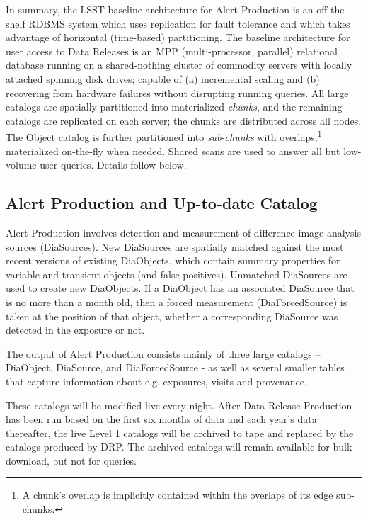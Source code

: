 \documentclass[DM,lsstdraft,toc]{lsstdoc}
\begin{document}
In summary, the LSST baseline architecture for Alert Production is an
off-the-shelf RDBMS system which uses replication for fault tolerance
and which takes advantage of horizontal (time-based) partitioning. The
baseline architecture for user access to Data Releases is an MPP
(multi-processor, parallel) relational database running on a
shared-nothing cluster of commodity servers with locally attached
spinning disk drives; capable of (a) incremental scaling and (b)
recovering from hardware failures without disrupting running queries.
All large catalogs are spatially partitioned into materialized
\emph{chunks}, and the remaining catalogs are replicated on each server;
the chunks are distributed across all nodes. The Object catalog is
further partitioned into \emph{sub-chunks} with overlaps,\footnote{A
  chunk's overlap is implicitly contained within the overlaps of its
  edge sub-chunks.} materialized on-the-fly when needed. Shared scans
are used to answer all but low-volume user queries. Details follow
below.

\subsection{Alert Production and Up-to-date
Catalog}\label{alert-production-and-up-to-date-catalog}

Alert Production involves detection and measurement of
difference-image-analysis sources (DiaSources). New DiaSources are
spatially matched against the most recent versions of existing
DiaObjects, which contain summary properties for variable and transient
objects (and false positives). Unmatched DiaSources are used to create
new DiaObjects. If a DiaObject has an associated DiaSource that is no
more than a month old, then a forced measurement (DiaForcedSource) is
taken at the position of that object, whether a corresponding DiaSource
was detected in the exposure or not.

The output of Alert Production consists mainly of three large catalogs
-- DiaObject, DiaSource, and DiaForcedSource - as well as several
smaller tables that capture information about e.g. exposures, visits and
provenance.

These catalogs will be modified live every night. After Data Release
Production has been run based on the first six months of data and each
year's data thereafter, the live Level 1 catalogs will be archived to
tape and replaced by the catalogs produced by DRP. The archived catalogs
will remain available for bulk download, but not for queries.
\end{document}
